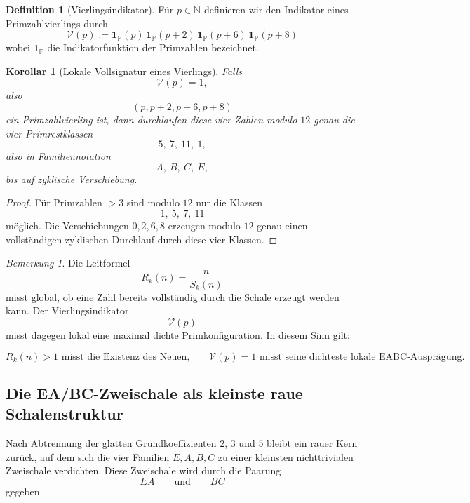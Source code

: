 \documentclass[11pt,a4paper]{article}
\newtheorem{korollar}[satz]{Korollar}
\theoremstyle{definition}
\newtheorem{definition}[satz]{Definition}
\theoremstyle{remark}
\newtheorem{bemerkung}[satz]{Bemerkung}
\begin{document}
	\begin{definition}[Vierlingsindikator]
		Für \(p\in\mathbb N\) definieren wir den Indikator eines Primzahlvierlings durch
		\[
		\boxed{
			\mathcal V(p):=
			\mathbf 1_{\mathbb P}(p)\,
			\mathbf 1_{\mathbb P}(p+2)\,
			\mathbf 1_{\mathbb P}(p+6)\,
			\mathbf 1_{\mathbb P}(p+8)
		}
		\]
		wobei \(\mathbf 1_{\mathbb P}\) die Indikatorfunktion der Primzahlen bezeichnet.
	\end{definition}
	
	\begin{korollar}[Lokale Vollsignatur eines Vierlings]
		\label{kor:leitformel_vierling}
		Falls
		\[
		\mathcal V(p)=1,
		\]
		also
		\[
		(p,p+2,p+6,p+8)
		\]
		ein Primzahlvierling ist, dann durchlaufen diese vier Zahlen modulo \(12\) genau die
		vier Primrestklassen
		\[
		5,\ 7,\ 11,\ 1,
		\]
		also in Familiennotation
		\[
		A,\ B,\ C,\ E,
		\]
		bis auf zyklische Verschiebung.
	\end{korollar}
	
	\begin{proof}
		Für Primzahlen \(>3\) sind modulo \(12\) nur die Klassen
		\[
		1,\ 5,\ 7,\ 11
		\]
		möglich. Die Verschiebungen \(0,2,6,8\) erzeugen modulo \(12\) genau einen vollständigen
		zyklischen Durchlauf durch diese vier Klassen.
	\end{proof}
	
	\begin{bemerkung}
		Die Leitformel
		\[
		R_k(n)=\frac{n}{S_k(n)}
		\]
		misst global, ob eine Zahl bereits vollständig durch die Schale erzeugt werden kann.
		Der Vierlingsindikator
		\[
		\mathcal V(p)
		\]
		misst dagegen lokal eine maximal dichte Primkonfiguration. In diesem Sinn gilt:
		
		\[
		\boxed{
			R_k(n)>1
			\text{ misst die Existenz des Neuen,}
			\qquad
			\mathcal V(p)=1
			\text{ misst seine dichteste lokale EABC-Ausprägung.}
		}
		\]
	\end{bemerkung}
	
	\subsection{Die EA/BC-Zweischale als kleinste raue Schalenstruktur}
	
	Nach Abtrennung der glatten Grundkoeffizienten \(2\), \(3\) und \(5\) bleibt ein rauer
	Kern zurück, auf dem sich die vier Familien \(E,A,B,C\) zu einer kleinsten nichttrivialen
	Zweischale verdichten. Diese Zweischale wird durch die Paarung
	\[
	EA
	\qquad\text{und}\qquad
	BC
	\]
	gegeben.
	
\end{document}
